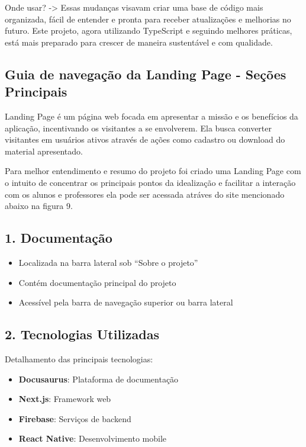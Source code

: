 \begin{itemize}
\begin{itemize}
Onde usar?  ->  Essas mudanças visavam criar uma base de código mais organizada, fácil de entender e pronta para receber atualizações e melhorias no futuro. Este projeto, agora utilizando TypeScript e seguindo melhores práticas, está mais preparado para crescer de maneira sustentável e com qualidade.










\subsection{Guia de navegação da Landing Page - Seções Principais}



Landing Page é um página web focada em apresentar a missão e os benefícios da aplicação, incentivando os visitantes a se envolverem. Ela busca converter visitantes em usuários ativos através de ações como cadastro ou download do material apresentado.

Para melhor entendimento e resumo do projeto foi criado uma Landing Page com o intuito de concentrar os principais pontos da idealização e facilitar a interação com os alunos e professores ela pode ser acessada atráves do site mencionado abaixo na figura 9. 


\subsection{1. Documentação}
\begin{itemize}
    \item Localizada na barra lateral sob ``Sobre o projeto''
    \item Contém documentação principal do projeto
    \item Acessível pela barra de navegação superior ou barra lateral
\end{itemize}

\subsection{2. Tecnologias Utilizadas}
Detalhamento das principais tecnologias:
\begin{itemize}
    \item \textbf{Docusaurus}: Plataforma de documentação
    \item \textbf{Next.js}: Framework web
    \item \textbf{Firebase}: Serviços de backend
    \item \textbf{React Native}: Desenvolvimento mobile
\end{itemize}


\end{itemize}
\end{itemize}
